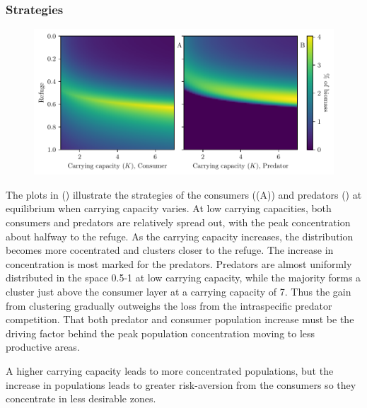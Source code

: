 \subsubsection*{Strategies}
\begin{figure}[H]
  \begin{centering}
    \includegraphics{plots/increasing_car_cap_c.pdf}
  \end{centering}
  \label{fig:strat_car}
\end{figure}
The plots in () illustrate the strategies of the consumers ((A)) and predators () at equilibrium when carrying capacity varies. At low carrying capacities, both consumers and predators are relatively spread out, with the peak concentration about halfway to the refuge. As the carrying capacity increases, the distribution becomes more cocentrated and clusters closer to the refuge. The increase in concentration is most marked for the predators. Predators are almost uniformly distributed in the space 0.5-1 at low carrying capacity, while the majority forms a cluster just above the consumer layer at a carrying capacity of 7. Thus the gain from clustering gradually outweighs the loss from the intraspecific predator competition. That both predator and consumer population increase must be the driving factor behind the peak population concentration moving to less productive areas.

A higher carrying capacity leads to more concentrated populations, but the increase in populations leads to greater risk-aversion from the consumers so they concentrate in less desirable zones.

